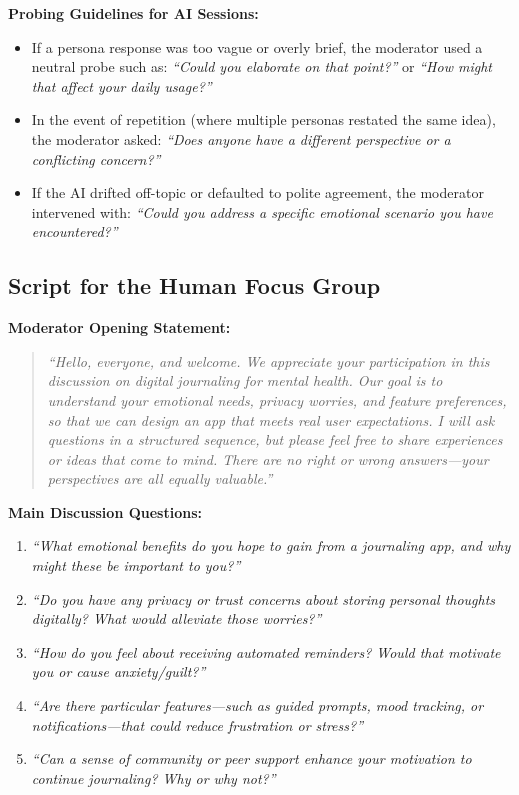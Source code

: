 \documentclass[acmsmall]{acmart}
\begin{document}
\noindent
\textbf{Probing Guidelines for AI Sessions:}
\begin{itemize}
    \item If a persona response was too vague or overly brief, the moderator used a neutral probe such as: 
    \emph{``Could you elaborate on that point?''} or \emph{``How might that affect your daily usage?''}
    \item In the event of repetition (where multiple personas restated the same idea), the moderator asked: 
    \emph{``Does anyone have a different perspective or a conflicting concern?''}
    \item If the AI drifted off-topic or defaulted to polite agreement, the moderator intervened with: 
    \emph{``Could you address a specific emotional scenario you have encountered?''}
\end{itemize}

\subsection{Script for the Human Focus Group}

\noindent
\textbf{Moderator Opening Statement:}
\begin{quote}
\emph{``Hello, everyone, and welcome. We appreciate your participation in this discussion on digital journaling for mental health. 
Our goal is to understand your emotional needs, privacy worries, and feature preferences, so that we can design an app that meets real user expectations. 
I will ask questions in a structured sequence, but please feel free to share experiences or ideas that come to mind. 
There are no right or wrong answers—your perspectives are all equally valuable.''}
\end{quote}

\noindent
\textbf{Main Discussion Questions:}
\begin{enumerate}
    \item \emph{``What emotional benefits do you hope to gain from a journaling app, and why might these be important to you?''}
    \item \emph{``Do you have any privacy or trust concerns about storing personal thoughts digitally? What would alleviate those worries?''}
    \item \emph{``How do you feel about receiving automated reminders? Would that motivate you or cause anxiety/guilt?''}
    \item \emph{``Are there particular features—such as guided prompts, mood tracking, or notifications—that could reduce frustration or stress?''}
    \item \emph{``Can a sense of community or peer support enhance your motivation to continue journaling? Why or why not?''}
\end{enumerate}
\end{document}
